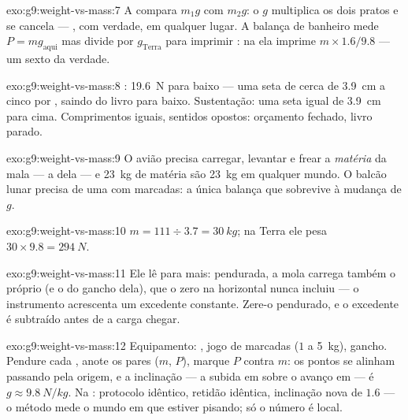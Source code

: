 \begin{solution}{exo:g9:weight-vs-mass:7}
A  compara $m_1 g$ com $m_2 g$: o $g$ multiplica os
dois pratos e se cancela --- , com verdade, em qualquer lugar. A
balança de banheiro mede $P = m g_{\text{aqui}}$ mas divide por
$g_{\text{Terra}}$ para imprimir : na  ela imprime
$m \times 1.6/9.8$ --- um sexto da verdade.
\end{solution}

\begin{solution}{exo:g9:weight-vs-mass:8}
: \qty{19.6}{N} para baixo --- uma seta de cerca de \qty{3.9}{cm}
a cinco  por , saindo do livro para baixo.
Sustentação: uma seta igual de \qty{3.9}{cm} para cima. Comprimentos
iguais, sentidos opostos: orçamento fechado, livro parado.
\end{solution}

\begin{solution}{exo:g9:weight-vs-mass:9}
O avião precisa carregar, levantar e frear a \emph{matéria} da mala
--- a  dela --- e \qty{23}{kg} de matéria são \qty{23}{kg} em
qualquer mundo. O balcão lunar precisa de uma  com
 marcadas: a única balança que sobrevive à mudança de $g$.
\end{solution}

\begin{solution}{exo:g9:weight-vs-mass:10}
$m = 111 \div 3.7 = \qty{30}{kg}$; na Terra ele pesa
$30 \times 9.8 = \qty{294}{N}$.
\end{solution}

\begin{solution}{exo:g9:weight-vs-mass:11}
Ele lê para mais: pendurada, a mola carrega também o próprio  (e
o do gancho dela), que o zero na horizontal nunca incluiu --- o
instrumento acrescenta um excedente constante. Zere-o pendurado, e o
excedente é subtraído antes de a carga chegar.
\end{solution}

\begin{solution}{exo:g9:weight-vs-mass:12}
Equipamento: , jogo de  marcadas ($1$ a
\qty{5}{kg}), gancho. Pendure cada , anote os pares ($m$, $P$),
marque $P$ contra $m$: os pontos se alinham passando pela origem, e a
inclinação --- a subida em  sobre o avanço em  ---
é $g \approx \qty{9.8}{N/kg}$. Na : protocolo idêntico, retidão
idêntica, inclinação nova de $1.6$ --- o método mede o mundo em que
estiver pisando; só o número é local.
\end{solution}

